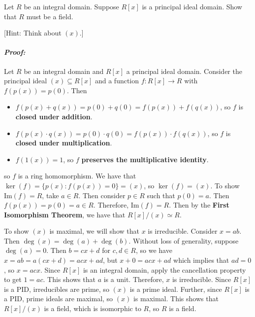 \documentclass [12pt] {article}
\renewcommand{\it}[1]{\textit{{#1}}}
\newenvironment{problem}{\begin{tcolorbox}[title=Problem,colback=black!5!white,colframe=black!75!black]}{\end{tcolorbox}}
\newenvironment{response}{\begin{responseframe}\vspace{-10pt}\paragraph{\it{Proof:}}}{\end{responseframe}}
\begin{document}
\newpage
\begin{problem}
    Let $R$ be an integral domain. Suppose $R[x]$ is a principal ideal domain. Show that $R$ must be a
    field.

    [Hint: Think about $(x)$.]
\end{problem}
\begin{response}
    Let $R$ be an integral domain and $R[x]$ a principal ideal domain. Consider the principal ideal
    $(x) \subseteq R[x]$ and a function $f : R[x] \to R$ with $f(p(x)) = p(0)$. Then
    \begin{itemize}
        \item $f(p(x) + q(x)) = p(0) + q(0) = f(p(x)) + f(q(x))$, so $f$ is
            \textbf{closed under addition}.
        \item $f(p(x) \cdot q(x)) = p(0) \cdot q(0) = f(p(x)) \cdot f(q(x))$, so $f$ is
            \textbf{closed under multiplication}.
        \item $f(1(x)) = 1$, so $f$ \textbf{preserves the multiplicative identity}.
    \end{itemize}
    so $f$ is a ring homomorphism. We have that $\ker(f) = \{ p(x) : f(p(x)) = 0 \} = (x)$, so
    $\ker(f) = (x)$. To show $\text{Im}(f) = R$, take $a \in R$. Then consider
    $p \in R$ such that $p(0) = a$. Then $f(p(x)) = p(0) = a \in R$. Therefore,
    $\text{Im}(f) = R$. Then by the \textbf{First Isomorphism Theorem}, we have that
    $R[x]/(x) \simeq R$.
    \vspace{0.5em}

    To show $(x)$ is maximal, we will show that $x$ is irreducible. Consider
    $x=ab$. Then $\deg(x)=\deg(a)+\deg(b)$. Without loss of generality,
    suppose $\deg(a)=0$. Then $b=cx+d$ for $c,d\in R$, so we have
    $x=ab=a(cx+d)=acx+ad$, but $x+0=acx+ad$ which implies that $ad=0$, so
    $x=acx$. Since $R[x]$ is an integral domain, apply the cancellation property
    to get $1=ac$. This shows that $a$ is a unit. Therefore, $x$ is irreducible.
    Since $R[x]$ is a PID, irreducibles are prime, so $(x)$ is a prime ideal.
    Further, since $R[x]$ is a PID, prime ideals are maximal, so $(x)$ is
    maximal. This shows that $R[x]/(x)$ is a field, which is isomorphic to $R$,
    so $R$ is a field.
\end{response}
\end{document}

